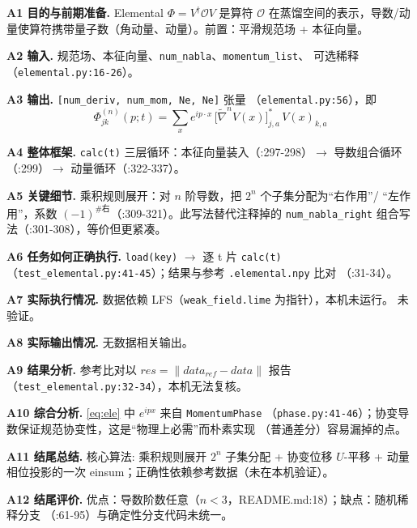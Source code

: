 \documentclass[UTF8]{ctexart}
\begin{document}
\textbf{A1 目的与前期准备.} Elemental $\Phi = V^\dagger \mathcal O V$ 是算符 $\mathcal O$
在蒸馏空间的表示，导数/动量使算符携带量子数（角动量、动量）。前置：平滑规范场 + 本征向量。

\textbf{A2 输入.} 规范场、本征向量、\texttt{\nolinkurl{num_nabla}}、\texttt{\nolinkurl{momentum_list}}、
可选稀释（\texttt{\nolinkurl{elemental.py:16-26}}）。

\textbf{A3 输出.} \texttt{[num\_deriv, num\_mom, Ne, Ne]} 张量
（\texttt{\nolinkurl{elemental.py:56}}），即
\begin{equation}\label{eq:ele}
  \Phi^{(n)}_{jk}(p;t) = \sum_x e^{ip\cdot x}\, \big[\tilde\nabla^n V(x)\big]_{j,a}^\ast\, V(x)_{k,a}
\end{equation}

\textbf{A4 整体框架.} \texttt{calc(t)} 三层循环：本征向量装入（:297-298）$\to$
导数组合循环（:299）$\to$ 动量循环（:322-337）。

\textbf{A5 关键细节.} 乘积规则展开：对 $n$ 阶导数，把 $2^n$ 个子集分配为``右作用''/
``左作用''，系数 $(-1)^{\#\text{右}}$（:309-321）。此写法替代注释掉的
\texttt{\nolinkurl{num_nabla_right}} 组合写法（:301-308），等价但更紧凑。



\textbf{A6 任务如何正确执行.} \texttt{load(key)} $\to$ 逐 t 片 \texttt{calc(t)}
（\texttt{\nolinkurl{test_elemental.py:41-45}}）；结果与参考 \texttt{\nolinkurl{.elemental.npy}} 比对
（:31-34）。

\textbf{A7 实际执行情况.} 数据依赖 LFS（\texttt{\nolinkurl{weak_field.lime}} 为指针），本机未运行。
\textcolor{warn}{未验证}。

\textbf{A8 实际输出情况.} 无数据相关输出。

\textbf{A9 结果分析.} 参考比对以 $res=\lVert data_{ref}-data\rVert$ 报告
（\texttt{\nolinkurl{test_elemental.py:32-34}}），本机无法复核。

\textbf{A10 综合分析.} \eqref{eq:ele} 中 $e^{ipx}$ 来自 \texttt{MomentumPhase}
（\texttt{\nolinkurl{phase.py:41-46}}）；协变导数保证规范协变性，这是``物理上必需''而朴素实现
（普通差分）容易漏掉的点。

\textbf{A11 结尾总结.} \textcolor{algo}{核心算法:} 乘积规则展开 $2^n$ 子集分配 + 协变位移
$U$-平移 + 动量相位投影的一次 einsum；正确性依赖参考数据（未在本机验证）。

\textbf{A12 结尾评价.} 优点：导数阶数任意（$n<3$，README.md:18）；缺点：随机稀释分支
（:61-95）与确定性分支代码未统一。
\end{document}
